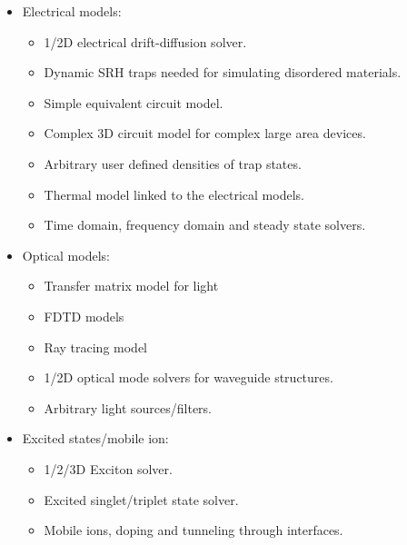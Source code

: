 \begin{itemize}
  \item Electrical models:
  \begin{itemize}
    \vspace{-0.2cm}\item 1/2D electrical drift-diffusion solver.
    \vspace{-0.2cm}\item Dynamic SRH traps needed for simulating disordered materials.
    \vspace{-0.2cm}\item Simple equivalent circuit model.
    \vspace{-0.2cm}\item Complex 3D circuit model for complex large area devices.
    \vspace{-0.2cm}\item Arbitrary user defined densities of trap states.
    \vspace{-0.2cm}\item Thermal model linked to the electrical models.
    \vspace{-0.2cm}\item Time domain, frequency domain and steady state solvers.
  \end{itemize}
  \item Optical models:
  \begin{itemize}
    \vspace{-0.2cm}\item Transfer matrix model for light
    \vspace{-0.2cm}\item FDTD models
    \vspace{-0.2cm}\item Ray tracing model
    \vspace{-0.2cm}\item 1/2D optical mode solvers for waveguide structures.
    \vspace{-0.2cm}\item Arbitrary light sources/filters.
  \end{itemize}
  \item Excited states/mobile ion:
  \begin{itemize}
    \vspace{-0.2cm}\item 1/2/3D Exciton solver.
    \vspace{-0.2cm}\item Excited singlet/triplet state solver.
    \vspace{-0.2cm}\item Mobile ions, doping and tunneling through interfaces.

\end{itemize}
\end{itemize}
